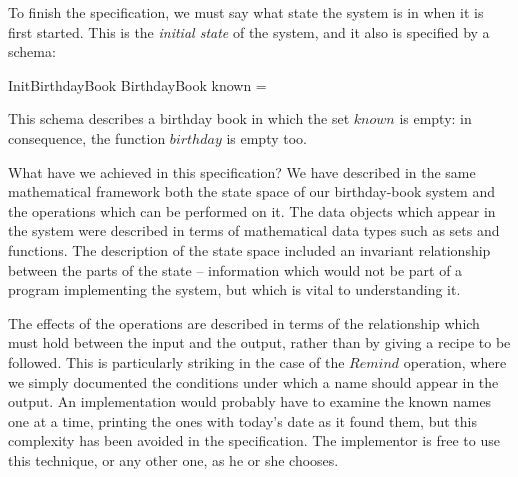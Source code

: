 \documentclass{llncs}
\begin{document}
To finish the specification, we must say what state the system is in
when it is first started. This is the {\em initial state\/} of the
system, and it also is specified by a schema:
\begin{schema}{InitBirthdayBook}
	BirthdayBook
\where
	known = \emptyset
\end{schema}
This schema describes a birthday book in which the set $known$ is
empty: in consequence, the function $birthday$ is empty too.

What have we achieved in this specification? We have described in the
same mathematical framework both the state space of our birthday-book
system and the operations which can be performed on it.  The data
objects which appear in the system were described in terms of
mathematical data types such as sets and functions. The description of
the state space included an invariant relationship between the parts of
the state -- information which would not be part of a program
implementing the system, but which is vital to understanding it.

The effects of the operations are described in terms of the
relationship which must hold between the input and the
output, rather than by giving a recipe to be followed. This
is particularly striking in the case of the $Remind$
operation, where we simply documented the conditions under
which a name should appear in the output. An implementation
would probably have to examine the known names one at a
time, printing the ones with today's date as it found them,
but this complexity has been avoided in the specification. The
implementor is free to use this technique, or any other one,
as he or she chooses.

\end{document}
